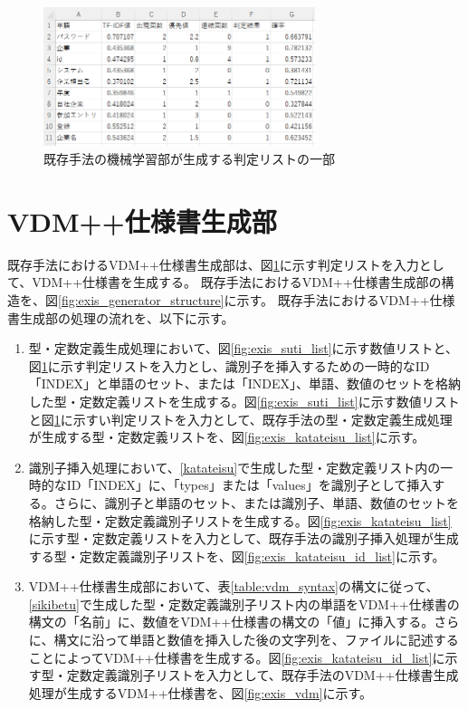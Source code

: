 \begin{figure}[tp]
    \begin{center}
        \includegraphics[width=300]{image/exis_judge_list.png}
        \caption{既存手法の機械学習部が生成する判定リストの一部}
        \label{fig:exis_judge_list}
    \end{center}
\end{figure}

\section{VDM++仕様書生成部}
既存手法におけるVDM++仕様書生成部は、図\ref{fig:exis_judge_list}に示す判定リストを入力として、VDM++仕様書を生成する。
既存手法におけるVDM++仕様書生成部の構造を、図\ref{fig:exis_generator_structure}に示す。
既存手法におけるVDM++仕様書生成部の処理の流れを、以下に示す。

\begin{enumerate}
    \item 型・定数定義生成処理において、図\ref{fig:exis_suti_list}に示す数値リストと、図\ref{fig:exis_judge_list}に示す判定リストを入力とし、識別子を挿入するための一時的なID「INDEX」と単語のセット、または「INDEX」、単語、数値のセットを格納した型・定数定義リストを生成する。図\ref{fig:exis_suti_list}に示す数値リストと図\ref{fig:exis_judge_list}に示すい判定リストを入力として、既存手法の型・定数定義生成処理が生成する型・定数定義リストを、図\ref{fig:exis_katateisu_list}に示す。
    \label{katateisu}
    \item 識別子挿入処理において、\ref{katateisu}で生成した型・定数定義リスト内の一時的なID「INDEX」に、「types」または「values」を識別子として挿入する。さらに、識別子と単語のセット、または識別子、単語、数値のセットを格納した型・定数定義識別子リストを生成する。図\ref{fig:exis_katateisu_list}に示す型・定数定義リストを入力として、既存手法の識別子挿入処理が生成する型・定数定義識別子リストを、図\ref{fig:exis_katateisu_id_list}に示す。
    \label{sikibetu}
    \item VDM++仕様書生成部において、表\ref{table:vdm_syntax}の構文に従って、\ref{sikibetu}で生成した型・定数定義識別子リスト内の単語をVDM++仕様書の構文の「名前」に、数値をVDM++仕様書の構文の「値」に挿入する。さらに、構文に沿って単語と数値を挿入した後の文字列を、ファイルに記述することによってVDM++仕様書を生成する。図\ref{fig:exis_katateisu_id_list}に示す型・定数定義識別子リストを入力として、既存手法のVDM++仕様書生成処理が生成するVDM++仕様書を、図\ref{fig:exis_vdm}に示す。
\end{enumerate}

